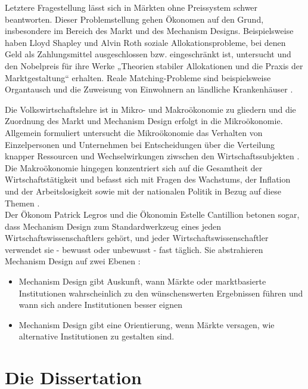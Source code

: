 \documentclass[a4paper,bibliography=totocnumbered,12pt]{article}
\begin{document}
Letztere Fragestellung lässt sich in Märkten ohne Preissystem schwer beantworten. Dieser Problemstellung gehen Ökonomen auf den Grund, insbesondere im Bereich des Markt und des Mechanism Designs. Beispielsweise haben Lloyd Shapley und Alvin Roth soziale Allokationsprobleme, bei denen Geld als Zahlungsmittel ausgeschlossen bzw. eingeschränkt ist, untersucht und den Nobelpreis für ihre Werke „Theorien stabiler Allokationen und die Praxis der Marktgestaltung“ erhalten. Reale Matching-Probleme sind beispielsweise Organtausch \cite{rothKidneyExchange2004a} und die Zuweisung von Einwohnern an ländliche Krankenhäuser \cite{rothAllocationResidentsRural1986}.

Die Volkswirtschaftslehre ist in Mikro- und Makroökonomie zu gliedern und die Zuordnung des Markt und Mechanism Design erfolgt in die Mikroökonomie.  \\ 
Allgemein formuliert untersucht die Mikroökonomie das Verhalten von Einzelpersonen und Unternehmen bei Entscheidungen über die Verteilung knapper Ressourcen und Wechselwirkungen ziwschen den Wirtschaftssubjekten \cite{marchant1991macroeconomic}. \\
Die Makroökonomie hingegen konzentriert sich auf die Gesamtheit der Wirtschaftstätigkeit und befasst sich mit Fragen des Wachstums, der Inflation und der Arbeitslosigkeit sowie mit der nationalen Politik in Bezug auf diese Themen \cite{mankiw2003macroeconomics}. \\


Der Ökonom Patrick Legros und die Ökonomin Estelle Cantillion betonen sogar, dass Mechanism Design zum Standardwerkzeug eines jeden Wirtschaftswissenschaftlers gehört, und jeder Wirtschaftswissenschaftler verwendet sie - bewusst oder unbewusst - fast täglich. Sie abstrahieren Mechanism Design auf zwei Ebenen \cite{legrosNobelPrizeWhat2007}:
	\begin{itemize}
	\item	Mechanism Design gibt Auskunft, wann Märkte oder marktbasierte Institutionen wahrscheinlich zu den wünschenswerten Ergebnissen führen und wann sich andere Institutionen besser eignen
	\item	Mechanism Design gibt eine Orientierung, wenn Märkte versagen, wie alternative Institutionen zu gestalten sind.
	\end{itemize}


\newpage
\section{Die Dissertation}
\end{document}

